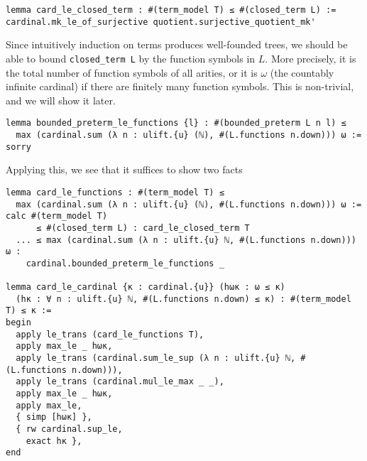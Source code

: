\documentclass{article}
\newcommand{\om}{\omega}
\newcommand{\<}{\langle}
\renewcommand{\>}{\rangle}
\theoremstyle{definitionstyle}
\theoremstyle{exercisestyle}
\theoremstyle{remarkstyle}
\begin{document}
\begin{lstlisting}
lemma card_le_closed_term : #(term_model T) ≤ #(closed_term L) :=
cardinal.mk_le_of_surjective quotient.surjective_quotient_mk' \end{lstlisting}

Since intuitively induction on terms produces well-founded trees,
we should be able to bound \texttt{closed\_term L} by
the function symbols in $L$.
More precisely, it is the total number of function symbols of all arities,
or it is $\om$ (the countably infinite cardinal) if there are finitely many
function symbols.
This is non-trivial, and we will show it later. %
\begin{lstlisting}
lemma bounded_preterm_le_functions {l} : #(bounded_preterm L n l) ≤
  max (cardinal.sum (λ n : ulift.{u} (ℕ), #(L.functions n.down))) ω := sorry \end{lstlisting}

Applying this, we see that it suffices to show two facts



\begin{lstlisting}
lemma card_le_functions : #(term_model T) ≤
  max (cardinal.sum (λ n : ulift.{u} (ℕ), #(L.functions n.down))) ω :=
calc #(term_model T)
      ≤ #(closed_term L) : card_le_closed_term T
  ... ≤ max (cardinal.sum (λ n : ulift.{u} ℕ, #(L.functions n.down))) ω :
    cardinal.bounded_preterm_le_functions _

lemma card_le_cardinal {κ : cardinal.{u}} (hωκ : ω ≤ κ)
  (hκ : ∀ n : ulift.{u} ℕ, #(L.functions n.down) ≤ κ) : #(term_model T) ≤ κ :=
begin
  apply le_trans (card_le_functions T),
  apply max_le _ hωκ,
  apply le_trans (cardinal.sum_le_sup (λ n : ulift.{u} ℕ, #(L.functions n.down))),
  apply le_trans (cardinal.mul_le_max _ _),
  apply max_le _ hωκ,
  apply max_le,
  { simp [hωκ] },
  { rw cardinal.sup_le,
    exact hκ },
end

\end{lstlisting}

{}

\end{document}
